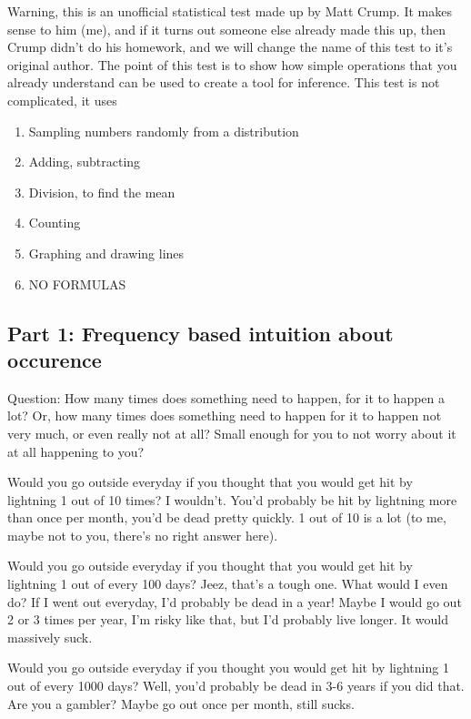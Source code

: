 \documentclass[
]{book}
\providecommand{\tightlist}{%
  \setlength{\itemsep}{0pt}\setlength{\parskip}{0pt}}
\begin{document}
Warning, this is an unofficial statistical test made up by Matt Crump. It makes sense to him (me), and if it turns out someone else already made this up, then Crump didn't do his homework, and we will change the name of this test to it's original author. The point of this test is to show how simple operations that you already understand can be used to create a tool for inference. This test is not complicated, it uses

\begin{enumerate}
\def\labelenumi{\arabic{enumi}.}
\tightlist
\item
  Sampling numbers randomly from a distribution
\item
  Adding, subtracting
\item
  Division, to find the mean
\item
  Counting
\item
  Graphing and drawing lines
\item
  NO FORMULAS
\end{enumerate}

\subsection{Part 1: Frequency based intuition about occurence}\label{part-1-frequency-based-intuition-about-occurence}

Question: How many times does something need to happen, for it to happen a lot? Or, how many times does something need to happen for it to happen not very much, or even really not at all? Small enough for you to not worry about it at all happening to you?

Would you go outside everyday if you thought that you would get hit by lightning 1 out of 10 times? I wouldn't. You'd probably be hit by lightning more than once per month, you'd be dead pretty quickly. 1 out of 10 is a lot (to me, maybe not to you, there's no right answer here).

Would you go outside everyday if you thought that you would get hit by lightning 1 out of every 100 days? Jeez, that's a tough one. What would I even do? If I went out everyday, I'd probably be dead in a year! Maybe I would go out 2 or 3 times per year, I'm risky like that, but I'd probably live longer. It would massively suck.

Would you go outside everyday if you thought you would get hit by lightning 1 out of every 1000 days? Well, you'd probably be dead in 3-6 years if you did that. Are you a gambler? Maybe go out once per month, still sucks.
\end{document}
